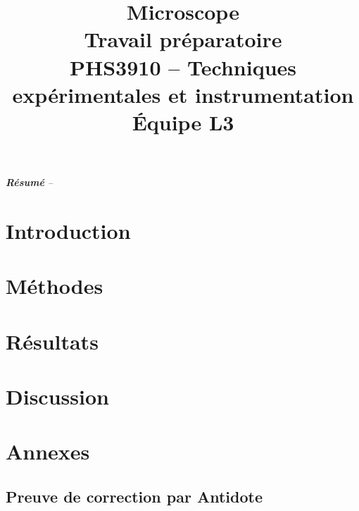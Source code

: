 \documentclass[conference]{IEEEtran}
\begin{document}
\title{Microscope\\
\large Travail préparatoire \\
PHS3910 -- Techniques expérimentales et instrumentation\\ 
Équipe L3}

\author{
\and
{}
\and
{}
\and
{}
}

\maketitle

\textit{\textbf{Résumé} -- }

\section{Introduction}

\section{Méthodes \label{methodes}}

\section{Résultats \label{resultats}}

\section{Discussion}

\printbibliography

\clearpage

\section{Annexes}

\subsection{Preuve de correction par Antidote}

\clearpage
\end{document}
